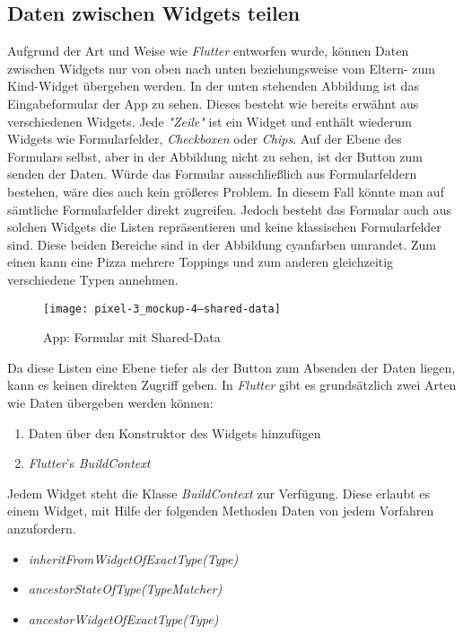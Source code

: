 \subsection{Daten zwischen Widgets teilen}
Aufgrund der Art und Weise wie \textit{Flutter} entworfen wurde,
können Daten zwischen Widgets nur von oben nach unten
beziehungsweise vom Eltern- zum Kind-Widget übergeben werden.
In der unten stehenden Abbildung ist das Eingabeformular der App zu sehen.
Dieses besteht wie bereits erwähnt aus verschiedenen Widgets.
Jede \textit{"Zeile"} ist ein Widget und enthält wiederum Widgets
wie Formularfelder, \textit{Checkboxen} oder \textit{Chips}.
Auf der Ebene des Formulars selbst, aber in der Abbildung nicht zu sehen,
ist der Button zum senden der Daten. Würde das Formular ausschließlich
aus Formularfeldern bestehen, wäre dies auch kein größeres Problem.
In diesem Fall könnte man auf sämtliche Formularfelder direkt zugreifen.
Jedoch besteht das Formular auch aus solchen Widgets die Listen
repräsentieren und keine klassischen Formularfelder sind.
Diese beiden Bereiche sind in der Abbildung cyanfarben umrandet.
Zum einen kann eine Pizza mehrere Toppings und zum anderen
gleichzeitig verschiedene Typen annehmen.

\begin{figure}[H]
    \centering
    \texttt{[image: pixel-3\_mockup-4--shared-data]}
    \caption{App: Formular mit Shared-Data}
\end{figure}

Da diese Listen eine Ebene tiefer als der Button zum Absenden der Daten liegen,
kann es keinen direkten Zugriff geben.
In \textit{Flutter} gibt es grundsätzlich zwei Arten wie Daten übergeben werden können:

\begin{enumerate}
    \itemsep-0.4em
    \item Daten über den Konstruktor des Widgets hinzufügen
    \item \textit{Flutter}'s \textit{BuildContext}
\end{enumerate}

\newpage

Jedem Widget steht die Klasse \textit{BuildContext} zur Verfügung.
Diese erlaubt es einem Widget, mit Hilfe der folgenden Methoden
Daten von jedem Vorfahren anzufordern.

\begin{itemize}
    \itemsep-0.4em
    \item \textit{inheritFromWidgetOfExactType(Type)}
    \item \textit{ancestorStateOfType(TypeMatcher)}
    \item \textit{ancestorWidgetOfExactType(Type)}
\end{itemize}

